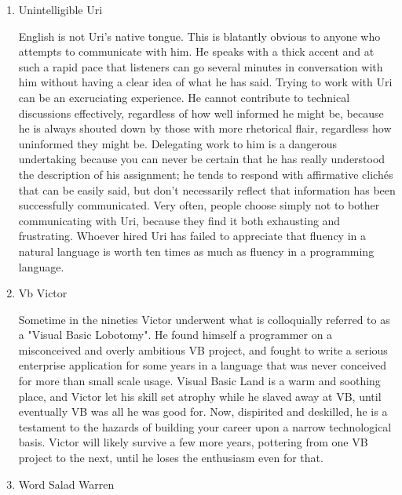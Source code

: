 \documentclass{article}
\begin{document}
\begin{enumerate}
\item Unintelligible Uri
\label{sec:orgheadline24}

English is not Uri's native tongue. This is blatantly obvious to anyone
who attempts to communicate with him. He speaks with a thick accent and
at such a rapid pace that listeners can go several minutes in
conversation with him without having a clear idea of what he has said.
Trying to work with Uri can be an excruciating experience. He cannot
contribute to technical discussions effectively, regardless of how well
informed he might be, because he is always shouted down by those with
more rhetorical flair, regardless how uninformed they might be.
Delegating work to him is a dangerous undertaking because you can never
be certain that he has really understood the description of his
assignment; he tends to respond with affirmative clichés that can be
easily said, but don't necessarily reflect that information has been
successfully communicated. Very often, people choose simply not to
bother communicating with Uri, because they find it both exhausting and
frustrating. Whoever hired Uri has failed to appreciate that fluency in
a natural language is worth ten times as much as fluency in a
programming language.

\item Vb Victor
\label{sec:orgheadline25}

Sometime in the nineties Victor underwent what is colloquially referred
to as a "Visual Basic Lobotomy". He found himself a programmer on a
misconceived and overly ambitious VB project, and fought to write a
serious enterprise application for some years in a language that was
never conceived for more than small scale usage. Visual Basic Land is a
warm and soothing place, and Victor let his skill set atrophy while he
slaved away at VB, until eventually VB was all he was good for. Now,
dispirited and deskilled, he is a testament to the hazards of building
your career upon a narrow technological basis. Victor will likely
survive a few more years, pottering from one VB project to the next,
until he loses the enthusiasm even for that.

\item Word Salad Warren
\label{sec:orgheadline26}


\end{enumerate}
\end{document}
